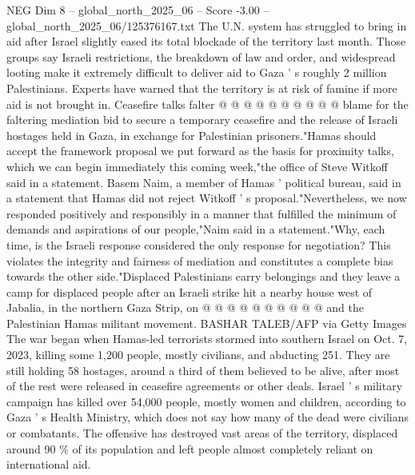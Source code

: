 \begin{textsample}{NEG Dim 8 – global\_north\_2025\_06 – Score -3.00 – global\_north\_2025\_06/125376167.txt}
The U.N. system has struggled to bring in aid after Israel slightly eased its total blockade of the territory last month.
Those groups say Israeli restrictions, the breakdown of law and order, and widespread looting make it extremely difficult to deliver aid to Gaza ' s roughly 2 million Palestinians.
Experts have warned that the territory is at risk of famine if more aid is not brought in.
Ceasefire talks falter @ @ @ @ @ @ @ @ @ @ blame for the faltering mediation bid to secure a temporary ceasefire and the release of Israeli hostages held in Gaza, in exchange for Palestinian prisoners."Hamas should accept the framework proposal we put forward as the basis for proximity talks, which we can begin immediately this coming week,"the office of Steve Witkoff said in a statement.
Basem Naim, a member of Hamas ' political bureau, said in a statement that Hamas did not reject Witkoff ' s proposal."Nevertheless, we now responded positively and responsibly in a manner that fulfilled the minimum of demands and aspirations of our people,"Naim said in a statement."Why, each time, is the Israeli response considered the only response for negotiation?
This violates the integrity and fairness of mediation and constitutes a complete bias towards the other side."Displaced Palestinians carry belongings and they leave a camp for displaced people after an Israeli strike hit a nearby house west of Jabalia, in the northern Gaza Strip, on @ @ @ @ @ @ @ @ @ @ and the Palestinian Hamas militant movement.
BASHAR TALEB/AFP via Getty Images The war began when Hamas-led terrorists stormed into southern Israel on Oct. 7, 2023, killing some 1,200 people, mostly civilians, and abducting 251.
They are still holding 58 hostages, around a third of them believed to be alive, after most of the rest were released in ceasefire agreements or other deals.
Israel ' s military campaign has killed over 54,000 people, mostly women and children, according to Gaza ' s Health Ministry, which does not say how many of the dead were civilians or combatants.
The offensive has destroyed vast areas of the territory, displaced around 90 \% of its population and left people almost completely reliant on international aid.

\end{textsample}
